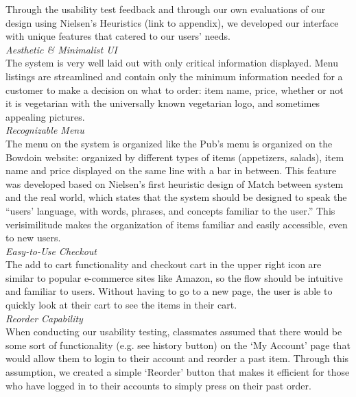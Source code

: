 \documentclass[runningheads]{llncs}
\begin{document}
Through the usability test feedback and through our own evaluations of our design using Nielsen’s Heuristics (link to appendix), we developed our interface with unique features that catered to our users’ needs. \\ 

\noindent \textit{Aesthetic \& Minimalist UI} \\ 
The system is very well laid out with only critical information displayed. Menu listings are streamlined and contain only the minimum information needed for a customer to make a decision on what to order: item name, price, whether or not it is vegetarian with the universally known vegetarian logo, and sometimes appealing pictures.\\ 

\noindent \textit{Recognizable Menu} \\
The menu on the system is organized like the Pub’s menu is organized on the Bowdoin website:  organized by different types of items (appetizers, salads), item name and price displayed on the same line with a bar in between. This feature was developed based on Nielsen’s first heuristic design of Match between system and the real world, which states that the system should be designed to speak the “users’ language, with words, phrases, and concepts familiar to the user.”  This verisimilitude makes the organization of items familiar and easily accessible, even to new users.  \\ 

\noindent \textit{Easy-to-Use Checkout}  \\ 
The add to cart functionality and checkout cart in the upper right icon are similar to popular e-commerce sites like Amazon, so the flow should be intuitive and familiar to users. Without having to go to a new page, the user is able to quickly look at their cart to see the items in their cart. \\

\noindent \textit{Reorder Capability}\\
When conducting our usability testing, classmates assumed that there would be some sort of functionality (e.g. see history button) on the ‘My Account’ page that would allow them to login to their account and reorder a past item. Through this assumption, we created a simple ‘Reorder’ button that makes it efficient for those who have logged in to their accounts to simply press on their past order.\\
\end{document}
